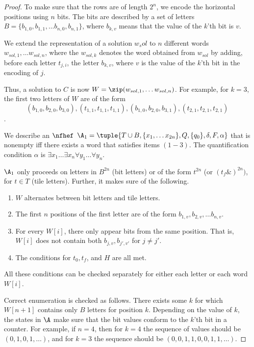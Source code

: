 \begin{proof}
To make sure that the rows are of length $2^n$, we encode the horizontal positions using $n$ bits. The bits are described by a set of letters $B = \{b_{1,0}, b_{1,1},\ldots b_{n,0},b_{n,1}\}$, where $b_{k,v}$ means that the value of the $k$'th bit is $v$. 

We extend the representation of a solution $w_sol$ to $n$ different words $w_{sol,1},\ldots w_{sol, n}$, where the $w_{sol,k}$ denotes the word obtained from $w_{sol}$ by adding, before each letter $t_{j,i}$, the letter $b_{k,v}$, where $v$ is the value of the $k$'th bit in the encoding of $j$. 

Thus, a solution to $C$ is now $W = \zip(w_{sol,1},\ldots w_{sol,n})$.
For example, for $k=3$, the first two letters of $W$ are of the form $$(b_{1,0},b_{2,0},b_{3,0}),(t_{1,1}, t_{1,1},t_{1,1}),(b_{1,0},b_{2,0},b_{3,1}),(t_{2,1},t_{2,1},t_{2,1})$$.

We describe an $\nfhef$ $\A_1 = \tuple{T\cup B, \{x_1,\ldots x_{2n}\}, Q, \{q_0\},\delta, F, \alpha}$ that is nonempty iff there exists a word that satisfies items $(1-3)$.
The quantification condition $\alpha$ is $\exists x_1\ldots \exists x_n \forall y_1 \ldots \forall y_n$.

$\A_1$ only proceeds on letters in $B^{2n}$ (bit letters) or of the form $t^{2n}$ (or $(t_f\&)^{2n})$, for $t\in T$ (tile letters). 
Further, it makes sure of the following.
\begin{enumerate}
    \item $W$ alternates between bit letters and tile letters. 
    \item The first $n$ positions of the first letter are of the form $b_{1,v},b_{2,v},\ldots b_{n,v}$.
    \item For every $W[i]$, there only appear bits from the same position. That is, $W[i]$ does not contain both $b_{j,v}, b_{j',v'}$ for $j\neq j'$.
    \item The conditions for $t_0, t_f$, and $H$ are all met.
\end{enumerate}

All these conditions can be checked separately for either each letter or each word $W[i]$. 

Correct enumeration is checked as follows. 
There exists some $k$ for which $W[n+1]$ contains only $B$ letters for position $k$. 
Depending on the value of $k$, the states in $\A$ make sure that the bit values conform to the $k$'th bit in a counter. For example, if $n=4$, then for $k=4$ the sequence of values should be $(0,1,0,1,\ldots)$, and for $k=3$ the sequence should be $(0,0,1,1,0,0,1,1,\ldots)$.


\end{proof}
